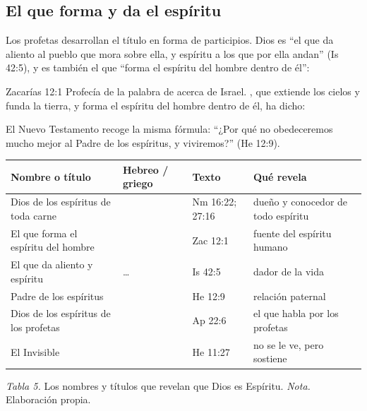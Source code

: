 
\subsection{El que forma y da el espíritu}

Los profetas desarrollan el título en forma de participios. Dios es ``el que da aliento al pueblo que mora sobre ella, y espíritu a los que por ella andan'' (Is 42:5), y es también el que ``forma el espíritu del hombre dentro de él'':

\begin{verso}{Zacarías 12:1}
Profecía de la palabra de \SENOR{} acerca de Israel. \SENOR, que extiende los cielos y funda la tierra, y forma el espíritu del hombre dentro de él, ha dicho:
\end{verso}

El Nuevo Testamento recoge la misma fórmula: ``¿Por qué no obedeceremos mucho mejor al Padre de los espíritus, y viviremos?'' (He 12:9).

\begin{center}\small\renewcommand{\arraystretch}{1.22}
\begin{tabular}{@{}L{4.3cm}L{4.6cm}L{2.0cm}L{3.4cm}@{}}
\toprule
\textbf{Nombre o título} & \textbf{Hebreo / griego} & \textbf{Texto} & \textbf{Qué revela} \\ \midrule
Dios de los espíritus de toda carne &  & Nm 16:22; 27:16 & dueño y conocedor de todo espíritu \\
El que forma el espíritu del hombre &  & Zac 12:1 & fuente del espíritu humano \\
El que da aliento y espíritu & \ldots{}  & Is 42:5 & dador de la vida \\
Padre de los espíritus &  & He 12:9 & relación paternal \\
Dios de los espíritus de los profetas &  & Ap 22:6 & el que habla por los profetas \\
El Invisible &  & He 11:27 & no se le ve, pero sostiene \\
\bottomrule
\end{tabular}\par
{\footnotesize\color{gris}\textit{Tabla 5.} Los nombres y títulos que revelan que Dios es Espíritu. \textit{Nota.} Elaboración propia.}
\end{center}

